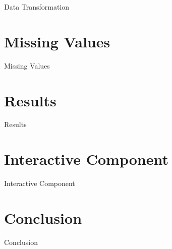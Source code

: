\documentclass[]{book}
\begin{document}
Data Transformation

\chapter{Missing Values}\label{missing-values}

Missing Values

\chapter{Results}\label{results}

Results

\chapter{Interactive Component}\label{interactive-component}

Interactive Component

\chapter{Conclusion}\label{conclusion}

Conclusion


\end{document}
